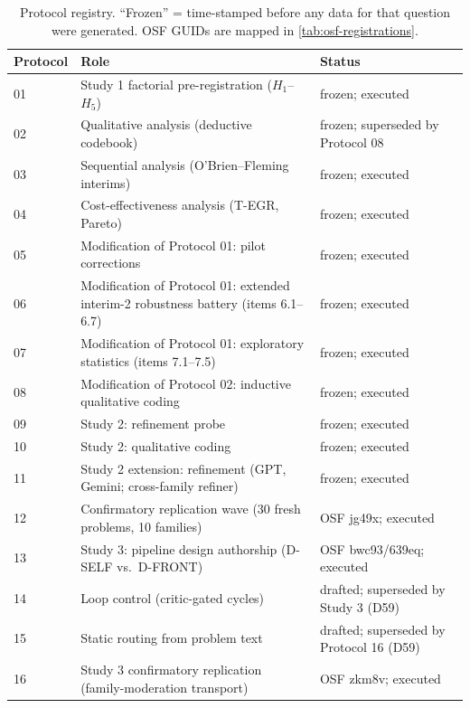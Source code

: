 \documentclass[12pt,a4paper]{article}
\begin{document}
\begin{table}[ht]
  \centering
  \caption{Protocol registry. ``Frozen'' = time-stamped before any data for
  that question were generated. OSF GUIDs are mapped in
  \cref{tab:osf-registrations}.}
  \label{tab:protocol-registry}
  \footnotesize
  \begin{tabular}{@{}l l l@{}}
    \toprule
    \textbf{Protocol} & \textbf{Role} & \textbf{Status} \\
    \midrule
    01 & Study 1 factorial pre-registration ($H_1$--$H_5$) & frozen; executed \\
    02 & Qualitative analysis (deductive codebook) & frozen; superseded by Protocol 08 \\
    03 & Sequential analysis (O'Brien--Fleming interims) & frozen; executed \\
    04 & Cost-effectiveness analysis (T-EGR, Pareto) & frozen; executed \\
    05 & Modification of Protocol 01: pilot corrections & frozen; executed \\
    06 & Modification of Protocol 01: extended interim-2 robustness battery (items 6.1--6.7) & frozen; executed \\
    07 & Modification of Protocol 01: exploratory statistics (items 7.1--7.5) & frozen; executed \\
    08 & Modification of Protocol 02: inductive qualitative coding & frozen; executed \\
    09 & Study 2: refinement probe & frozen; executed \\
    10 & Study 2: qualitative coding & frozen; executed \\
    11 & Study 2 extension: refinement (GPT, Gemini; cross-family refiner) & frozen; executed \\
    12 & Confirmatory replication wave (30 fresh problems, 10 families) & OSF jg49x; executed \\
    13 & Study 3: pipeline design authorship (D-SELF vs.\ D-FRONT) & OSF bwc93/639eq; executed \\
    14 & Loop control (critic-gated cycles) & drafted; superseded by Study 3 (D59) \\
    15 & Static routing from problem text & drafted; superseded by Protocol 16 (D59) \\
    16 & Study 3 confirmatory replication (family-moderation transport) & OSF zkm8v; executed \\
    \bottomrule
  \end{tabular}
\end{table}
\end{document}
